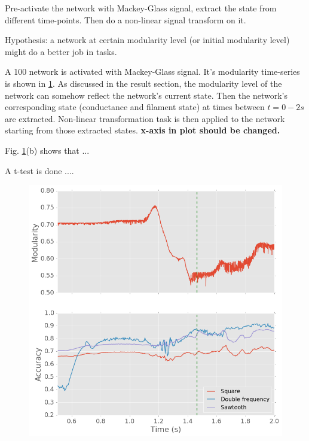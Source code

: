 \documentclass[%
 reprint,
 amsmath,amssymb,
 aps,
]{revtex4-2}
\begin{document}
Pre-activate the network with Mackey-Glass signal, extract the state from different time-points. Then do a non-linear signal transform on it. 

Hypothesis: a network at certain modularity level (or initial modularity level) might do a better job in tasks.

A 100 network is activated with Mackey-Glass signal. It's modularity time-series is shown in \ref{fig:pre_act_task}. As discussed in the result section, the modularity level of the network can somehow reflect the network's current state. Then the network's corresponding state (conductance and filament state) at times between $t = 0 - 2 s$ are extracted. Non-linear transformation task is then applied to the network starting from those extracted states. \textbf{x-axis in plot should be changed.}

Fig. \ref{fig:pre_act_task}(b) shows that ...

A t-test is done ....


\begin{figure}[h]
	\centering
	\includegraphics[width=1\linewidth]{figure/pre_act_task}
	\caption{}
	\label{fig:pre_act_task}
\end{figure}

 
\end{document}
